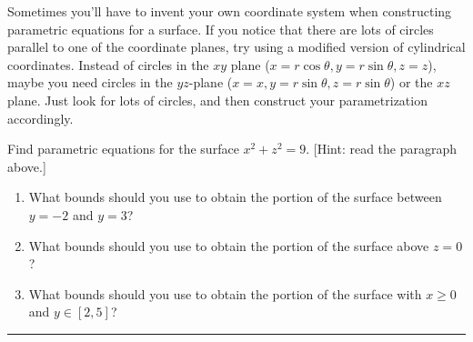 Sometimes you'll have to invent your own coordinate system when constructing parametric equations for a surface.  If you notice that there are lots of circles parallel to one of the coordinate planes, try using a modified version of cylindrical coordinates. Instead of circles in the $xy$ plane ($x=r\cos\theta,y=r\sin\theta,z=z$), maybe you need circles in the $yz$-plane ($x=x,y=r\sin\theta,z=r\sin\theta$) or the $xz$ plane.  Just look for lots of circles, and then construct your parametrization accordingly.
\begin{problem}
Find parametric equations for the surface $x^2+z^2=9$. [Hint: read the paragraph above.]  
\begin{enumerate}
 \item{}%
 What bounds should you use to obtain the portion of the surface between $y=-2$ and $y=3$?
 \item What bounds should you use to obtain the portion of the surface above $z=0$?
 \item What bounds should you use to obtain the portion of the surface with $x\geq 0$ and $y\in[2,5]$?
\end{enumerate}
\hrule\end{problem}

